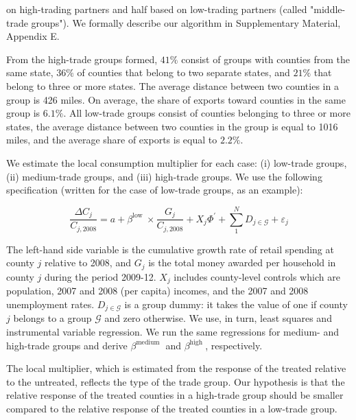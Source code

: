 \documentclass[\latexroot/\projectname]{subfiles}
\begin{document}
on high-trading partners and half based on low-trading partners (called "middle-trade groups"). We formally describe our algorithm in Supplementary Material, Appendix E.

From the high-trade groups formed, $41 \%$ consist of groups with counties from the same state, $36 \%$ of counties that belong to two separate states, and $21 \%$ that belong to three or more states. The average distance between two counties in a group is 426 miles. On average, the share of exports toward counties in the same group is $6.1 \%$. All low-trade groups consist of counties belonging to three or more states, the average distance between two counties in the group is equal to 1016 miles, and the average share of exports is equal to $2.2 \%$.

We estimate the local consumption multiplier for each case: (i) low-trade groups, (ii) medium-trade groups, and (iii) high-trade groups. We use the following specification (written for the case of low-trade groups, as an example):


\begin{equation*}
\frac{\Delta C_{j}}{C_{j, 2008}}=a+\beta^{\text {low }} \times \frac{G_{j}}{C_{j, 2008}}+X_{j} \Phi^{\prime}+\sum_{1}^{N} D_{j \in \mathcal{G}}+\varepsilon_{j} \tag{3.4}
\end{equation*}


The left-hand side variable is the cumulative growth rate of retail spending at county $j$ relative to 2008, and $G_{j}$ is the total money awarded per household in county $j$ during the period 2009-12. $X_{j}$ includes county-level controls which are population, 2007 and 2008 (per capita) incomes, and the 2007 and 2008 unemployment rates. $D_{j \in \mathcal{G}}$ is a group dummy: it takes the value of one if county $j$ belongs to a group $\mathcal{G}$ and zero otherwise. We use, in turn, least squares and instrumental variable regression. We run the same regressions for medium- and high-trade groups and derive $\beta^{\text {medium }}$ and $\beta^{\text {high }}$, respectively.

The local multiplier, which is estimated from the response of the treated relative to the untreated, reflects the type of the trade group. Our hypothesis is that the relative response of the treated counties in a high-trade group should be smaller compared to the relative response of the treated counties in a low-trade group.
\end{document}
